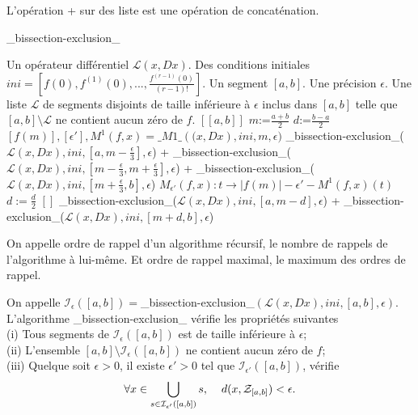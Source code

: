 \documentclass[a4paper,10pt]{article}
\begin{document}
	\newpage
	\begin{remarque}
		L'opération + sur des liste est une opération de concaténation.
	\end{remarque}	
	\begin{algorithm}
	\caption{\_bissection-exclusion\_}
	\begin{algorithmic}[1]
		\REQUIRE Un opérateur différentiel $\mathcal{L}(x,Dx)$. Des conditions initiales $ini=[f(0),f^{(1)}(0),...,\frac{f^{(r-1)}(0)}{(r-1)!}]$. Un segment $[a,b]$. Une précision $\epsilon$.
		\ENSURE Une liste $\mathcal{L}$ de segments disjoints de taille inférieure à $\epsilon$ inclus dans $[a,b]$ telle que $[a,b] \setminus\mathcal{L}$ ne contient aucun zéro de $f$.
		\RETURN $[[a,b]]$
		\ENDIF
		\STATE $m$:=$\frac{a+b}{2}$
		\STATE $d$:=$\frac{b-a}{2}$
		\STATE $[f(m)],[\epsilon'],M^1(f,x)=\_M1\_(\mathcal(x,Dx),ini,m,\epsilon)$
		\RETURN\_bissection-exclusion\_($\mathcal{L}(x,Dx),ini,[a,m-\frac{\epsilon}{3}],\epsilon$) + \_bissection-exclusion\_($\mathcal{L}(x,Dx),ini,[m-\frac{\epsilon}{3},m+\frac{\epsilon}{3}],\epsilon$) + \_bissection-exclusion\_($\mathcal{L}(x,Dx),ini,[m+\frac{\epsilon}{3},b],\epsilon$)
		\ENDIF
		\STATE$M_{\epsilon'}(f,x):t\rightarrow |f(m)|-\epsilon'-M^1(f,x)(t)$
		\STATE $d:=\frac{d}{2}$
		\ENDWHILE
		\RETURN $[]$
		\ELSE
		\RETURN\_bissection-exclusion\_($\mathcal{L}(x,Dx),ini,[a,m-d],\epsilon$) + \_bissection-exclusion\_($\mathcal{L}(x,Dx),ini,[m+d,b],\epsilon$)
		\ENDIF
	\end{algorithmic}
	\end{algorithm}
	\begin{definition}
		On appelle ordre de rappel d'un algorithme récursif, le nombre de rappels de l'algorithme à lui-même. Et ordre de rappel maximal, le maximum des ordres de rappel.
	\end{definition}

	\begin{proposition}
		On appelle $\mathcal{I}_\epsilon([a,b])=$\_bissection-exclusion\_$(\mathcal{L}(x,Dx),ini,[a,b],\epsilon)$.
		L'algorithme \_bissection-exclusion\_ vérifie les propriétés suivantes\\
		
		(i) Tous segments de $\mathcal{I}_{\epsilon}([a,b])$ est de taille inférieure à $\epsilon$;\\
		
		(ii) L'ensemble $[a,b]\setminus \mathcal{I}_{\epsilon}([a,b])$ ne contient aucun zéro de $f$;\\
		
		(iii) Quelque soit $\epsilon>0$, il existe $\epsilon'>0$ tel que $\mathcal{I}_{\epsilon'}([a,b])$, vérifie
		\[\forall x \in \bigcup_{s \in \mathcal{I}_{\epsilon'}([a,b])} s, \hspace{4mm} d(x,\mathcal{Z}_{[a,b]})<\epsilon.\]
		\label{bissection_eps}
	\end{proposition}
	
\end{document}
